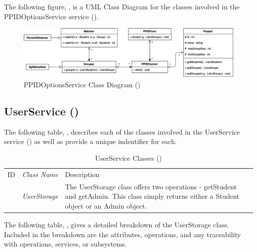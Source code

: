 \documentclass[12pt,letterpaper]{article}
\begin{document}
\newpage{}
The following figure, , is a UML Class Diagram for the classes involved in the PPIDOptionsService service ().

\begin{figure}[H]
	\centering{}
	\includegraphics[scale=0.27]{imgs/d3/interfaces/ppid-options.png}
	\caption{PPIDOptionsService Class Diagram ()}
\end{figure}

\subsection{UserService ()}

The following table, , describes each of the classes involved in the UserService service () as well as provide a unique indentifier for each.

\begin{table}[H]
	\caption{UserService Classes ()} 
	\begin{tabu} to 
	    \tableheader{}ID & Class Name & Description \\
         & UserStorage & The UserStorage class offers two operations - getStudent and getAdmin. This class simply returns either a Student object or an Admin object.\\
	\end{tabu}
\end{table}

The following table, , gives a detailed breakdown of the UserStorage class. Included in the breakdown are the attributes, operations, and any traceability with operations, services, or subsystems.
\end{document}
